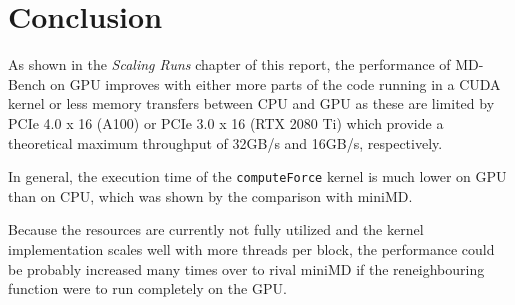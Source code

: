 \documentclass[12pt]{report}
\begin{document}
\newpage

\chapter{Conclusion}

As shown in the \textit{Scaling Runs} chapter of this report, the performance of MD-Bench on GPU improves with either more parts of the code running in a CUDA kernel
or less memory transfers between CPU and GPU as these are limited by PCIe 4.0 x 16 (A100) or PCIe 3.0 x 16 (RTX 2080 Ti) which provide a theoretical maximum
throughput of 32GB/s and 16GB/s, respectively.\par
In general, the execution time of the \lstinline{computeForce} kernel is much lower on GPU than on CPU, which was shown by the comparison with miniMD.\par
Because the resources are currently not fully utilized and the kernel implementation scales well with more threads per block, the performance could be
probably increased many times over to rival miniMD if the reneighbouring function were to run completely on the GPU.

\nocite{*}


\end{document}
